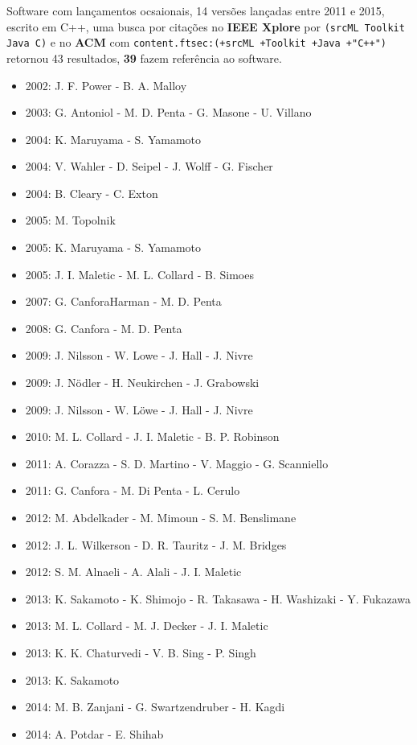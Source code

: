 Software com lançamentos ocsaionais,
14 versões lançadas
entre 2011 e 2015,
escrito em C++,
uma busca por citações no {\bf IEEE Xplore} por
\texttt{(srcML Toolkit Java C)}
e no {\bf ACM} com
\texttt{content.ftsec:(+srcML +Toolkit +Java +"C++")}
retornou
43 resultados,
{\bf 39} fazem referência ao software.

\begin{itemize}
\item 2002: J. F. Power - B. A. Malloy
\item 2003: G. Antoniol - M. D. Penta - G. Masone - U. Villano
\item 2004: K. Maruyama - S. Yamamoto
\item 2004: V. Wahler - D. Seipel - J. Wolff - G. Fischer
\item 2004: B. Cleary - C. Exton
\item 2005: M. Topolnik
\item 2005: K. Maruyama - S. Yamamoto
\item 2005: J. I. Maletic - M. L. Collard - B. Simoes
\item 2007: G. CanforaHarman - M. D. Penta
\item 2008: G. Canfora - M. D. Penta
\item 2009: J. Nilsson - W. Lowe - J. Hall - J. Nivre
\item 2009: J. Nödler - H. Neukirchen - J. Grabowski
\item 2009: J. Nilsson - W. L\"{o}we - J. Hall - J. Nivre
\item 2010: M. L. Collard - J. I. Maletic - B. P. Robinson
\item 2011: A. Corazza - S. D. Martino - V. Maggio - G. Scanniello
\item 2011: G. Canfora - M. Di Penta - L. Cerulo
\item 2012: M. Abdelkader - M. Mimoun - S. M. Benslimane
\item 2012: J. L. Wilkerson - D. R. Tauritz - J. M. Bridges
\item 2012: S. M. Alnaeli - A. Alali - J. I. Maletic
\item 2013: K. Sakamoto - K. Shimojo - R. Takasawa - H. Washizaki - Y. Fukazawa
\item 2013: M. L. Collard - M. J. Decker - J. I. Maletic
\item 2013: K. K. Chaturvedi - V. B. Sing - P. Singh
\item 2013: K. Sakamoto
\item 2014: M. B. Zanjani - G. Swartzendruber - H. Kagdi
\item 2014: A. Potdar - E. Shihab

\end{itemize}
